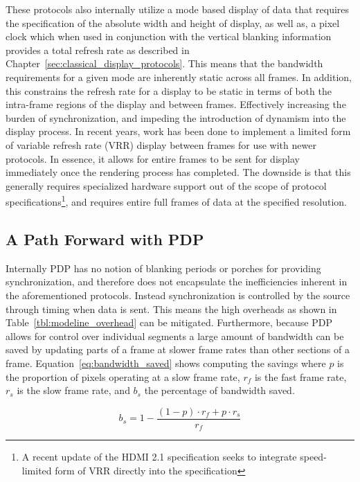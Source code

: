         These protocols also internally utilize a mode based display of data that requires the specification of the absolute width and height of display, as well as, a pixel clock which when used in conjunction with the vertical blanking information provides a total refresh rate as described in Chapter~\ref{sec:classical_display_protocols}. This means that the bandwidth requirements for a given mode are inherently static across all frames. In addition, this constrains the refresh rate for a display to be static in terms of both the intra-frame regions of the display and between frames. Effectively increasing the burden of synchronization, and impeding the introduction of dynamism into the display process. In recent years, work has been done to implement a limited form of variable refresh rate (VRR) display between frames for use with newer protocols\cite{AMDFreesync,NVIDIAGsync}. In essence, it allows for entire frames to be sent for display immediately once the rendering process has completed. The downside is that this generally requires specialized hardware support out of the scope of protocol specifications\footnote{A recent update of the HDMI 2.1 specification\cite{HDMIForum2018} seeks to integrate speed-limited form of VRR directly into the specification}, and requires entire full frames of data at the specified resolution.

    \subsection{A Path Forward with PDP}
        Internally PDP has no notion of blanking periods or porches for providing synchronization, and therefore does not encapsulate the inefficiencies inherent in the aforementioned protocols. Instead synchronization is controlled by the source through timing when data is sent. This means the high overheads as shown in Table~\ref{tbl:modeline_overhead} can be mitigated. Furthermore, because PDP allows for control over individual segments a large amount of bandwidth can be saved by updating parts of a frame at slower frame rates than other sections of a frame. Equation~\eqref{eq:bandwidth_saved} shows computing the savings where $p$ is the proportion of pixels operating at a slow frame rate, $r_f$ is the fast frame rate, $r_s$ is the slow frame rate, and $b_s$ the percentage of bandwidth saved.

        \begin{equation}
            b_s=1-\frac{(1-p)\cdot r_f + p\cdot r_s}{r_f}
            \label{eq:bandwidth_saved}
        \end{equation}

